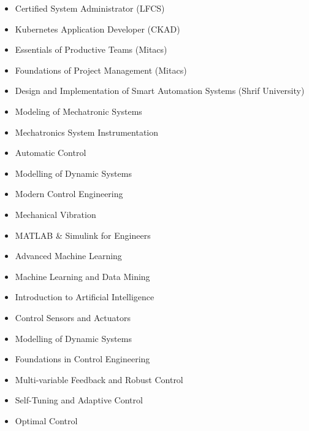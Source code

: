 \documentclass[10pt,letterpaper,ragged2e,compact]{mocv}
\begin{document}
\begin{paracol}{2}
    \divider

    \newpage
    \begin{itemize}
        \item Certified System Administrator (LFCS)  
        \item Kubernetes Application Developer (CKAD) 
        \item Essentials of Productive Teams (Mitacs)
        \item Foundations of Project Management (Mitacs)
        \item Design and Implementation of Smart Automation Systems (Shrif University)
    \end{itemize}
    \begin{itemize}
        \item Modeling of Mechatronic Systems
        \item Mechatronics System Instrumentation
        \item Automatic Control
        \item Modelling of Dynamic Systems
        \item Modern Control Engineering
        \item Mechanical Vibration
        \item MATLAB \& Simulink for Engineers
    \end{itemize}
    \begin{itemize}
        \item Advanced Machine Learning
        \item Machine Learning and Data Mining
        \item Introduction to Artificial Intelligence
        \item Control Sensors and Actuators
        \item Modelling of Dynamic Systems
        \item Foundations in Control Engineering
        \item Multi-variable Feedback and Robust Control
        \item Self-Tuning and Adaptive Control
        \item Optimal Control
    \end{itemize}

\end{paracol}
\end{document}
